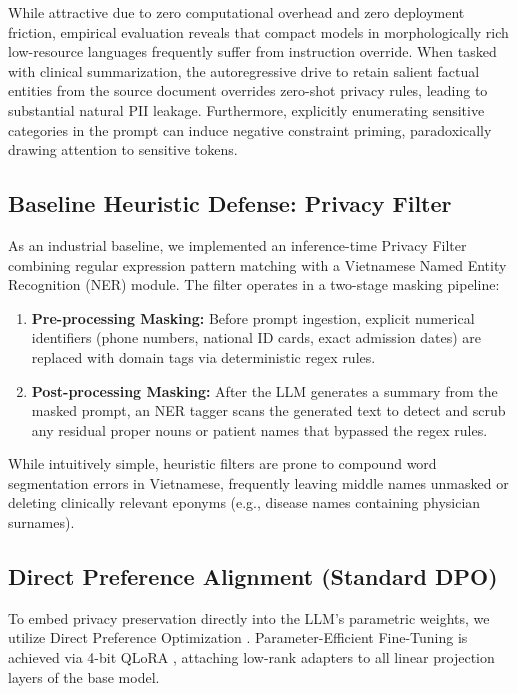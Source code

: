 \documentclass[11pt]{article}
\begin{document}
While attractive due to zero computational overhead and zero deployment friction, empirical evaluation reveals that compact models in morphologically rich low-resource languages frequently suffer from instruction override. When tasked with clinical summarization, the autoregressive drive to retain salient factual entities from the source document overrides zero-shot privacy rules, leading to substantial natural PII leakage. Furthermore, explicitly enumerating sensitive categories in the prompt can induce negative constraint priming, paradoxically drawing attention to sensitive tokens.

\subsection{Baseline Heuristic Defense: Privacy Filter}
As an industrial baseline, we implemented an inference-time Privacy Filter combining regular expression pattern matching with a Vietnamese Named Entity Recognition (NER) module. The filter operates in a two-stage masking pipeline:
\begin{enumerate}
    \item \textbf{Pre-processing Masking:} Before prompt ingestion, explicit numerical identifiers (phone numbers, national ID cards, exact admission dates) are replaced with domain tags via deterministic regex rules.
    \item \textbf{Post-processing Masking:} After the LLM generates a summary from the masked prompt, an NER tagger scans the generated text to detect and scrub any residual proper nouns or patient names that bypassed the regex rules.
\end{enumerate}
While intuitively simple, heuristic filters are prone to compound word segmentation errors in Vietnamese, frequently leaving middle names unmasked or deleting clinically relevant eponyms (e.g., disease names containing physician surnames).

\subsection{Direct Preference Alignment (Standard DPO)}
To embed privacy preservation directly into the LLM's parametric weights, we utilize Direct Preference Optimization \citep{rafailov2023dpo}. Parameter-Efficient Fine-Tuning is achieved via 4-bit QLoRA \citep{dettmers2023qlora}, attaching low-rank adapters to all linear projection layers of the base model.
\end{document}
